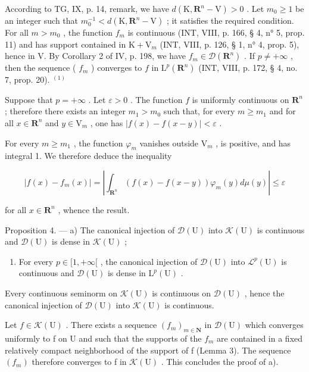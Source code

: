 According to TG, IX, p. 14, remark, we have \(d(\mathrm{K}, \mathbf{R}^{n}-\mathrm{V}) > 0\) . Let \(m_{0} \geqslant 1\) be an integer such that \(m_{0}^{-1} < d(\mathrm{K}, \mathbf{R}^{n}-\mathrm{V})\) ; it satisfies the required condition. For all \(m > m_{0}\) , the function \(f_{m}\) is continuous (INT, VIII, p. 166, § 4, n° 5, prop. 11) and has support contained in \(\mathrm{K} + \mathrm{V}_{m}\) (INT, VIII, p. 126, § 1, n° 4, prop. 5), hence in V. By Corollary 2 of IV, p. 198, we have \(f_{m} \in \mathcal{D}(\mathbf{R}^{n})\) . If \(p \neq +\infty\) , then the sequence ( \(f_{m}\) ) converges to \(f\) in \(\mathrm{L}^{p}(\mathbf{R}^{n})\) (INT, VIII, p. 172, § 4, no. 7, prop. 20). \(^{(1)}\)

Suppose that \(p = +\infty\) . Let \(\varepsilon > 0\) . The function \(f\) is uniformly continuous on \(\mathbf{R}^n\) ; therefore there exists an integer \(m_1 > m_0\) such that, for every \(m \geqslant m_1\) and for all \(x \in \mathbf{R}^n\) and \(y \in \mathrm{V}_m\) , one has \(|f(x) - f(x - y)| < \varepsilon\) .

For every \(m \geqslant m_{1}\) , the function \(\varphi_{m}\) vanishes outside \(\mathrm{V}_{m}\) , is positive, and has integral 1. We therefore deduce the inequality

\[
| f (x) - f _ {m} (x) | = \left| \int_ {\mathbf {R} ^ {n}} (f (x) - f (x - y)) \varphi_ {m} (y) d \mu (y) \right| \leqslant \varepsilon
\]

for all \(x \in \mathbf{R}^{n}\) , whence the result.

Proposition 4. --- a) The canonical injection of \(\mathcal{D}(\mathrm{U})\) into \(\mathcal{K}(\mathrm{U})\) is continuous and \(\mathcal{D}(\mathrm{U})\) is dense in \(\mathcal{K}(\mathrm{U})\) ;

\begin{enumerate}
\def\labelenumi{\alph{enumi})}
\setcounter{enumi}{1}
\tightlist
\item
  For every \(p \in [1, +\infty[\) , the canonical injection of \(\mathcal{D}(\mathrm{U})\) into \(\mathcal{L}^p(\mathrm{U})\) is continuous and \(\mathcal{D}(\mathrm{U})\) is dense in \(\mathrm{L}^p(\mathrm{U})\) .
\end{enumerate}

Every continuous seminorm on \(\mathcal{K}(\mathrm{U})\) is continuous on \(\mathcal{D}(\mathrm{U})\) , hence the canonical injection of \(\mathcal{D}(\mathrm{U})\) into \(\mathcal{K}(\mathrm{U})\) is continuous.

Let \(f \in \mathcal{K}(\mathrm{U})\) . There exists a sequence \((f_{m})_{m \in \mathbf{N}}\) in \(\mathcal{D}(\mathrm{U})\) which converges uniformly to f on U and such that the supports of the \(f_{m}\) are contained in a fixed relatively compact neighborhood of the support of f (Lemma 3). The sequence \((f_{m})\) therefore converges to f in \(\mathcal{K}(\mathrm{U})\) . This concludes the proof of a).

